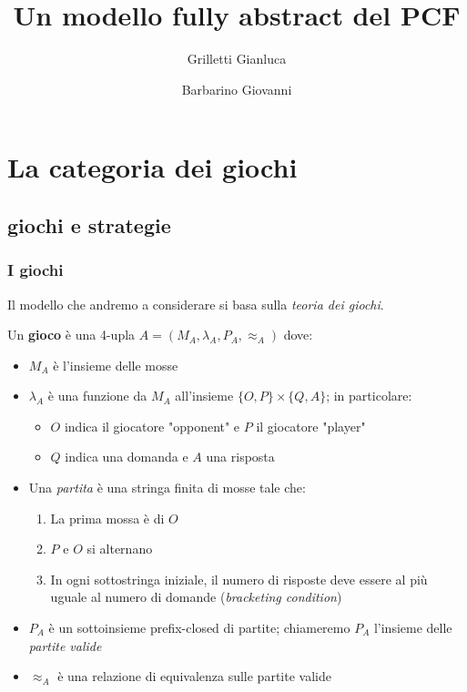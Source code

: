 \documentclass{beamer}
\title{Un modello fully abstract del PCF}
\author{Grilletti Gianluca \and Barbarino Giovanni}
\institute[Unipi]{Università di Pisa}
\begin{document}
\small


\begin{frame}
	\maketitle
	
\end{frame}

\section{La categoria dei giochi}


\subsection{giochi e strategie}

\begin{frame}
	\frametitle{I giochi}
	
	Il modello che andremo a considerare si basa sulla \emph{teoria dei giochi}.
	
	
	Un \textbf{gioco} è una 4-upla $A=( M_A , \lambda_A , P_A , \approx_A )$ dove:
	\begin{itemize}
	\item<2-> $M_A$ è l'insieme delle mosse
	\item<3-> $\lambda_A$ è una funzione da $M_A$ all'insieme $\{ O,P\} \times \{Q,A\}$; in particolare:
		\begin{itemize}
		\item $O$ indica il giocatore "opponent" e $P$ il giocatore "player"
		\item $Q$ indica una domanda e $A$ una risposta
		\end{itemize}
	\item<4-> Una \textit{partita} è una stringa finita di mosse tale che:
		\begin{enumerate}
		\item La prima mossa è di $O$
		\item $P$ e $O$ si alternano
		\item In ogni sottostringa iniziale, il numero di risposte deve essere al più uguale al numero di domande (\emph{bracketing condition})
		\end{enumerate}
	\item<5-> $P_A$ è un sottoinsieme prefix-closed di partite; chiameremo $P_A$ l'insieme delle \textit{partite valide}
	\item<6->  $\approx_A$ è una relazione di equivalenza sulle partite valide
	\end{itemize}
	
	
\end{frame}
\end{document}
